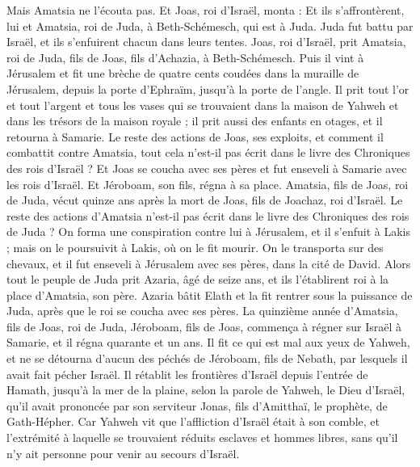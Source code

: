\begin{multicols}{2}
Mais Amatsia ne l'écouta pas. Et Joas, roi d'Israël, monta : Et ils s'affrontèrent, lui et Amatsia, roi de Juda, à Beth-Schémesch, qui est à Juda.
Juda fut battu par Israël, et ils s'enfuirent chacun dans leurs tentes.
Joas, roi d'Israël, prit Amatsia, roi de Juda, fils de Joas, fils d'Achazia, à Beth-Schémesch. Puis il vint à Jérusalem et fit une brèche de quatre cents coudées dans la muraille de Jérusalem, depuis la porte d'Ephraïm, jusqu'à la porte de l'angle.
Il prit tout l'or et tout l'argent et tous les vases qui se trouvaient dans la maison de Yahweh et dans les trésors de la maison royale ; il prit aussi des enfants en otages, et il retourna à Samarie.
Le reste des actions de Joas, ses exploits, et comment il combattit contre Amatsia, tout cela n'est-il pas écrit dans le livre des Chroniques des rois d'Israël ?
Et Joas se coucha avec ses pères et fut enseveli à Samarie avec les rois d'Israël. Et Jéroboam, son fils, régna à sa place.
Amatsia, fils de Joas, roi de Juda, vécut quinze ans après la mort de Joas, fils de Joachaz, roi d'Israël.
Le reste des actions d'Amatsia n'est-il pas écrit dans le livre des Chroniques des rois de Juda ?
On forma une conspiration contre lui à Jérusalem, et il s'enfuit à Lakis ; mais on le poursuivit à Lakis, où on le fit mourir.
On le transporta sur des chevaux, et il fut enseveli à Jérusalem avec ses pères, dans la cité de David.
Alors tout le peuple de Juda prit Azaria, âgé de seize ans, et ils l'établirent roi à la place d'Amatsia, son père.
Azaria bâtit Elath et la fit rentrer sous la puissance de Juda, après que le roi se coucha avec ses pères.
La quinzième année d'Amatsia, fils de Joas, roi de Juda, Jéroboam, fils de Joas, commença à régner sur Israël à Samarie, et il régna quarante et un ans.
Il fit ce qui est mal aux yeux de Yahweh, et ne se détourna d'aucun des péchés de Jéroboam, fils de Nebath, par lesquels il avait fait pécher Israël.
Il rétablit les frontières d'Israël depuis l'entrée de Hamath, jusqu'à la mer de la plaine, selon la parole de Yahweh, le Dieu d'Israël, qu'il avait prononcée par son serviteur Jonas, fils d'Amitthaï, le prophète, de Gath-Hépher.
Car Yahweh vit que l'affliction d'Israël était à son comble, et l'extrémité à laquelle se trouvaient réduits esclaves et hommes libres, sans qu'il n'y ait personne pour venir au secours d'Israël.

\end{multicols}
